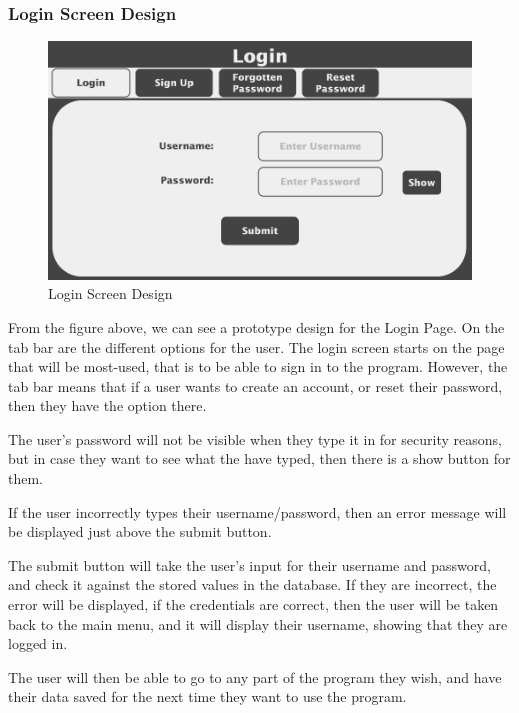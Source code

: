 \documentclass{article}
\begin{document}
\clearpage

\subsubsection{Login Screen Design}

\begin{figure}[ht]
    \centering
    \includegraphics[scale=0.3]{login-screen-design}
    \caption{Login Screen Design}
\end{figure}

From the figure above, we can see a prototype design for the Login Page.
On the tab bar are the different options for the user. The login screen starts on the page that will be most-used, that is to be able to sign in to the program. However, the tab bar means that if a user wants to create an account, or reset their password, then they have the option there.

The user's password will not be visible when they type it in for security reasons, but in case they want to see what the have typed, then there is a show button for them.

If the user incorrectly types their username/password, then an error message will be displayed just above the submit button.

The submit button will take the user's input for their username and password, and check it against the stored values in the database. If they are incorrect, the error will be displayed, if the credentials are correct, then the user will be taken back to the main menu, and it will display their username, showing that they are logged in.

The user will then be able to go to any part of the program they wish, and have their data saved for the next time they want to use the program.
\end{document}
